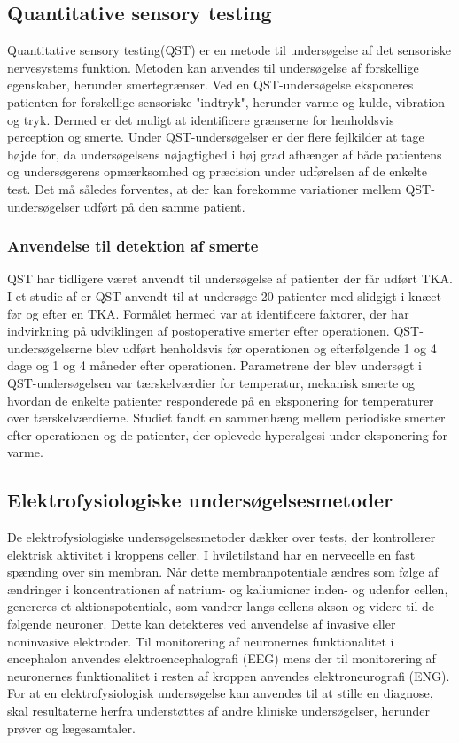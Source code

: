 \subsection{Quantitative sensory testing}
Quantitative sensory testing(QST) er en metode til undersøgelse af det sensoriske nervesystems funktion. Metoden kan anvendes til undersøgelse af forskellige egenskaber, herunder smertegrænser. Ved en QST-undersøgelse eksponeres patienten for forskellige sensoriske "indtryk", herunder varme og kulde, vibration og tryk. Dermed er det muligt at identificere grænserne for henholdsvis perception og smerte. Under QST-undersøgelser er der flere fejlkilder at tage højde for, da undersøgelsens nøjagtighed i høj grad afhænger af både patientens og undersøgerens opmærksomhed og præcision under udførelsen af de enkelte test. Det må således forventes, at der kan forekomme variationer mellem QST-undersøgelser udført på den samme patient. \citep{4}

\subsubsection{Anvendelse til detektion af smerte}
QST har tidligere været anvendt til undersøgelse af patienter der får udført TKA. I et studie af \citep{5} er QST anvendt til at undersøge 20 patienter med slidgigt i knæet før og efter en TKA. Formålet hermed var at identificere faktorer, der har indvirkning på udviklingen af postoperative smerter efter operationen. QST-undersøgelserne blev udført henholdsvis før operationen og efterfølgende 1 og 4 dage og 1 og 4 måneder efter operationen. Parametrene der blev undersøgt i QST-undersøgelsen var tærskelværdier for temperatur, mekanisk smerte og hvordan de enkelte patienter responderede på en eksponering for temperaturer over tærskelværdierne. Studiet fandt en sammenhæng mellem periodiske smerter efter operationen og de patienter, der oplevede hyperalgesi under eksponering for varme. \citep{5} 

\subsection{Elektrofysiologiske undersøgelsesmetoder}
De elektrofysiologiske undersøgelsesmetoder dækker over tests, der kontrollerer elektrisk aktivitet i kroppens celler. I hviletilstand har en nervecelle en fast spænding over sin membran. Når dette membranpotentiale ændres som følge af ændringer i koncentrationen af natrium- og kaliumioner inden- og udenfor cellen, genereres et aktionspotentiale, som vandrer langs cellens akson og videre til de følgende neuroner. Dette kan detekteres ved anvendelse af invasive eller noninvasive elektroder. Til monitorering af neuronernes funktionalitet i encephalon anvendes elektroencephalografi (EEG) mens der til monitorering af neuronernes funktionalitet i resten af kroppen anvendes elektroneurografi (ENG). For at en elektrofysiologisk undersøgelse kan anvendes til at stille en diagnose, skal resultaterne herfra understøttes af andre kliniske undersøgelser, herunder prøver og lægesamtaler. \citep{6}

